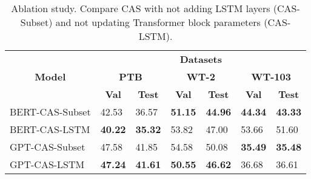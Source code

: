 \documentclass[11pt,a4paper]{article}
\begin{document}
\begin{table*}[t!]
\centering
\begin{tabular}{|l|l|l|l|l|l|l|}
\hline
\multicolumn{1}{|c|}{\multirow{3}{*}{\textbf{Model}}} & \multicolumn{6}{c|}{\textbf{Datasets}}                                                                                                                                                                                   \\ \cline{2-7} 
\multicolumn{1}{|c|}{}                                & \multicolumn{2}{c|}{\textbf{PTB}}                                      & \multicolumn{2}{c|}{\textbf{WT-2}}                                     & \multicolumn{2}{c|}{\textbf{WT-103}}                                   \\ \cline{2-7} 
\multicolumn{1}{|c|}{}                                & \multicolumn{1}{c|}{\textbf{Val}} & \multicolumn{1}{c|}{\textbf{Test}} & \multicolumn{1}{c|}{\textbf{Val}} & \multicolumn{1}{c|}{\textbf{Test}} & \multicolumn{1}{c|}{\textbf{Val}} & \multicolumn{1}{c|}{\textbf{Test}} \\ \hline
BERT-CAS-Subset                                   & 42.53                             & 36.57                              & \textbf{51.15}                             & \textbf{44.96}                              & \textbf{44.34}                             & \textbf{43.33}                              \\ \hline
BERT-CAS-LSTM               & \textbf{40.22}                             & \textbf{35.32}                              & 53.82                             & 47.00                              & 53.66                             & 51.60                              \\ \hline\hline
GPT-CAS-Subset                                    & 47.58                             & 41.85                              & 54.58                             & 50.08                              & \textbf{35.49}                             & \textbf{35.48}                              \\ \hline
GPT-CAS-LSTM                & \textbf{47.24}                             & \textbf{41.61}                              & \textbf{50.55}                             & \textbf{46.62}                     & 36.68                             & 36.61                              \\ \hline

\end{tabular}
\caption{Ablation study. Compare CAS with not adding LSTM layers (CAS-Subset) and not updating Transformer block parameters (CAS-LSTM). }
\label{tab:abl}
\end{table*}
\end{document}
